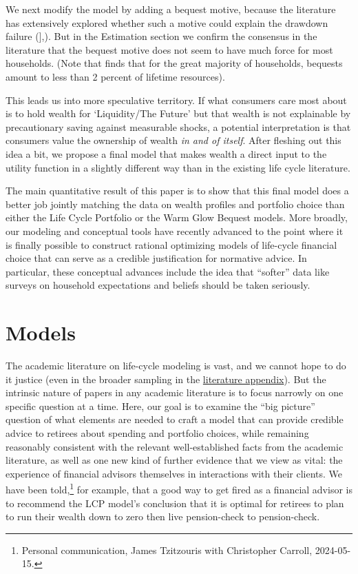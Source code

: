 \documentclass{article}
\begin{document}
We next modify the model by adding a bequest motive, because the literature has extensively explored whether such a motive could explain the drawdown failure (\href{@deNardi2004}{}],\cite{DeNardi2016d}).
But in the Estimation section we confirm the consensus in the literature that the bequest motive does not seem to have much force for most households.
(Note that \cite{Hendricks_2002} finds that for the great majority of households, bequests amount to less than 2 percent of lifetime resources).

This leads us into more speculative territory.
If what consumers care most about is to hold wealth for `Liquidity/The Future' but that wealth is not explainable by precautionary saving against measurable shocks, a potential interpretation is that consumers value the ownership of wealth \textit{in and of itself}.
After fleshing out this idea a bit, we propose a final model that makes wealth a direct input to the utility function in a slightly different way than in the existing life cycle literature.

The main quantitative result of this paper is to show that this final model does a better job jointly matching the data on wealth profiles and portfolio choice than either the Life Cycle Portfolio or the Warm Glow Bequest models.
More broadly, our modeling and conceptual tools have recently advanced to the point where it is finally possible to construct rational optimizing models of life-cycle financial choice that can serve as a credible justification for normative advice.
In particular, these conceptual advances include the idea that ``softer'' data like surveys on household expectations and beliefs should be taken seriously.

\section{Models}

The academic literature on life-cycle modeling is vast, and we cannot hope to do it justice (even in the broader sampling in the \href{\#lit-review}{literature appendix}).
But the intrinsic nature of papers in any academic literature is to focus narrowly on one specific question at a time.
Here, our goal is to examine the ``big picture'' question of what elements are needed to craft a model that can provide credible advice to retirees about spending and portfolio choices, while remaining reasonably consistent with the relevant well-established facts from the academic literature, as well as one new kind of further evidence that we view as vital: the experience of financial advisors themselves in interactions with their clients.
We have been told,\footnote{Personal communication, James Tzitzouris with Christopher Carroll, 2024-05-15.} for example, that a good way to get fired as a financial advisor is to recommend the LCP model's conclusion that it is optimal for retirees to plan to run their wealth down to zero then live pension-check to pension-check.
\end{document}
